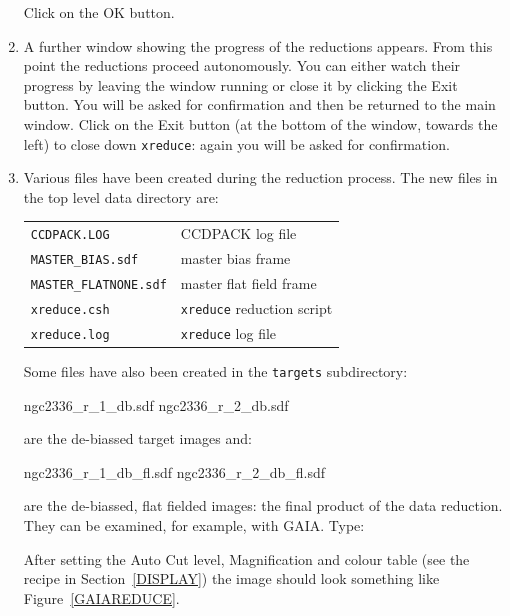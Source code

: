 \documentclass[twoside,11pt]{starlink}
\begin{document}
\begin{enumerate}
   Click on the \textsf{OK} button.

  \item A further window showing the progress of the reductions appears.
   From this point the reductions proceed autonomously.  You can
   either watch their progress by leaving the window running or close it
   by clicking the \textsf{Exit} button.  You will be asked for confirmation
   and then be returned to the main window.  Click on the \textsf{Exit} button
   (at the bottom of the window, towards the left) to close down \texttt{xreduce}: again you will be asked for confirmation.

  \item Various files have been created during the reduction process.
   The new files in the top level data directory are:

  \begin{center}
  \begin{tabular}{ll}
   \texttt{CCDPACK.LOG}          & CCDPACK log file \\
   \texttt{MASTER\_BIAS.sdf}     & master bias frame \\
   \texttt{MASTER\_FLATNONE.sdf} & master flat field frame \\
   \texttt{xreduce.csh}          & \texttt{xreduce} reduction script \\
   \texttt{xreduce.log}          & \texttt{xreduce} log file \\
  \end{tabular}
  \end{center}

   Some files have also been created in the \texttt{targets} subdirectory:

\begin{terminalv}
ngc2336_r_1_db.sdf
ngc2336_r_2_db.sdf
\end{terminalv}

   are the de-biassed target images and:

\begin{terminalv}
ngc2336_r_1_db_fl.sdf
ngc2336_r_2_db_fl.sdf
\end{terminalv}

   are the de-biassed, flat fielded images: the final product of the
   data reduction.  They can be examined, for example, with GAIA.  Type:
\begin{terminalv}
\end{terminalv}

   After setting the \textsf{Auto Cut} level, \textsf{Magnification} and colour
   table (see the recipe in Section~\ref{DISPLAY}) the image should look
   something like Figure~\ref{GAIAREDUCE}.


\end{enumerate}
\end{document}
